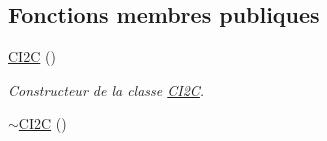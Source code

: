\subsection*{Fonctions membres publiques}
\begin{DoxyCompactItemize}
\item 
\hyperlink{classCI2C_a2df83a2627a8b8bf91460a68372c9ed5}{C\+I2\+C} ()
\begin{DoxyCompactList}\small\item\em Constructeur de la classe \hyperlink{classCI2C}{C\+I2\+C}. \end{DoxyCompactList}\item 
\hypertarget{classCI2C_ae757710bb84ab327217092f0af851a16}{\hyperlink{classCI2C_ae757710bb84ab327217092f0af851a16}{$\sim$\+C\+I2\+C} ()}\label{classCI2C_ae757710bb84ab327217092f0af851a16}


\end{DoxyCompactItemize}
